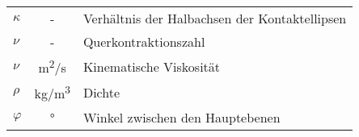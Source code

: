 \begin{longtable}{>{$}l<{$}cp{12cm}}
    \kappa           & -                                        & Verhältnis der Halbachsen der Kontaktellipsen                \\
    \nu              & -                                        & Querkontraktionszahl                                         \\
    \nu              & \si{m^2/s}                               & Kinematische Viskosität                                      \\
    \rho             & \si{kg/m^3}                              & Dichte                                                       \\
    \varphi          & \si{\degree}                             & Winkel zwischen den Hauptebenen                              \\
\end{longtable}%

